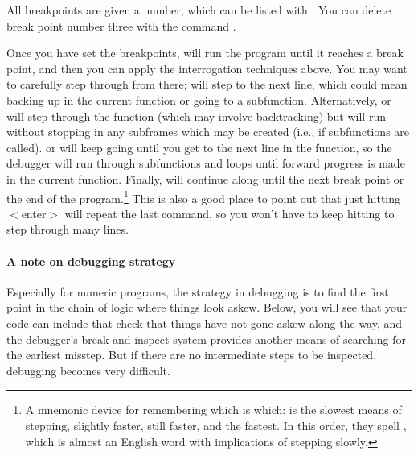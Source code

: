 All breakpoints are given a number, which can be listed with
. You can delete break point number three with
the command .

Once you have set the breakpoints,  will run the program until it
reaches a break point, and then you can apply the interrogation techniques
above. You may want to carefully step through from there; 
will step to the next line, which could mean backing up in the current
function or going to a subfunction. Alternatively,  or 
 will step through the function (which may involve backtracking) but
will run without stopping in any subframes which may be created
(i.e., if subfunctions are called).   or  will keep
going until you get to the next line in the function, so the debugger
will run through subfunctions and loops until forward progress is made
in the current function.  Finally,  will continue along until the next
break point or the end of the program.\footnote{A mnemonic device for
remembering which is which:  is the slowest means of stepping,
 slightly faster,  still faster, and  the fastest. In
this order, they spell , which is almost an English word
with implications of stepping slowly.} This is also a good place to
point out that just hitting $<$enter$>$ will repeat the last command,
so you won't have to keep hitting  to step through many lines.

\paragraph{A note on debugging strategy} Especially for numeric programs,
the strategy in debugging is to find the first point in the chain of
logic where things look askew. Below, you will see that your code can
include  that check that things have not gone askew
along the way, and the debugger's break-and-inspect system provides 
another means of searching for the earliest misstep. But if there are 
no intermediate steps to be inspected, debugging becomes very difficult.

